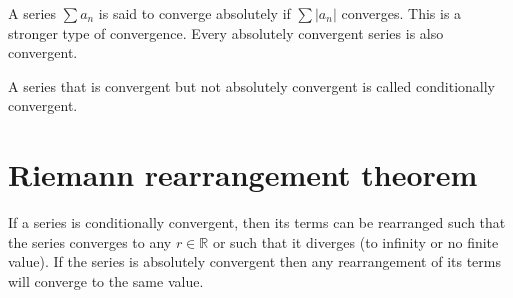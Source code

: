 \documentclass[a4paper]{article}
\begin{document}
A series \(\sum a_n\) is said to converge absolutely if
\(\sum |a_n|\) converges.
This is a stronger type of convergence. Every absolutely convergent series is also convergent.

A series that is convergent but not absolutely convergent is called conditionally convergent.

\section{Riemann rearrangement theorem}

If a series is conditionally convergent, then its terms can be rearranged such that
the series converges to any \(r\in \mathbb{R}\) or such that it diverges (to infinity or no finite value).
If the series is absolutely convergent then any rearrangement of its terms will converge to the same value.
\end{document}

